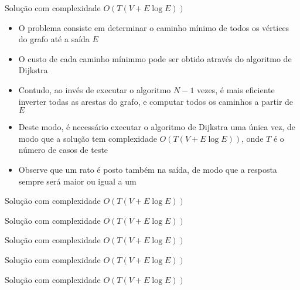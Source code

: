 \begin{frame}[fragile]{Solução com complexidade $O(T(V + E\log E))$}

    \begin{itemize}
        \item O problema consiste em determinar o caminho mínimo de todos os vértices do grafo
            até a saída $E$

        \item O custo de cada caminho mínimmo pode ser obtido através do algoritmo de Dijkstra

        \item Contudo, ao invés de executar o algoritmo $N - 1$ vezes, é mais eficiente inverter
            todas as arestas do grafo, e computar todos os caminhos a partir de $E$
        
        \item Deste modo, é necessário executar o algoritmo de Dijkstra uma única vez, de modo
            que a solução tem complexidade $O(T(V + E\log E))$, onde $T$ é o número de casos
            de teste

        \item Observe que um rato é posto também na saída, de modo que a resposta sempre será
            maior ou igual a um
   \end{itemize}

\end{frame}

\begin{frame}[fragile]{Solução com complexidade $O(T(V + E\log E))$}
\end{frame}

\begin{frame}[fragile]{Solução com complexidade $O(T(V + E\log E))$}
\end{frame}

\begin{frame}[fragile]{Solução com complexidade $O(T(V + E\log E))$}
\end{frame}

\begin{frame}[fragile]{Solução com complexidade $O(T(V + E\log E))$}
\end{frame}

\begin{frame}[fragile]{Solução com complexidade $O(T(V + E\log E))$}
\end{frame}

